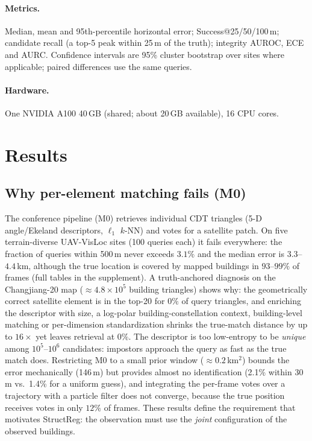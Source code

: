 \paragraph{Metrics.}
Median, mean and 95th-percentile horizontal error; Success@25/50/100\,m;
candidate recall (a top-5 peak within 25\,m of the truth); integrity AUROC,
ECE and AURC. Confidence intervals are 95\% cluster bootstrap over sites where
applicable; paired differences use the same queries.

\paragraph{Hardware.}
One NVIDIA A100 40\,GB (shared; about 20\,GB available), 16 CPU cores.

\section{Results}
\label{sec:exp_main}

\subsection{Why per-element matching fails (M0)}
\label{sec:why_m0}
The conference pipeline (M0) retrieves individual CDT triangles (5-D
angle/Ekeland descriptors, $\ell_1$ $k$-NN) and votes for a satellite patch.
On five terrain-diverse UAV-VisLoc sites (100 queries each) it fails
everywhere: the fraction of queries within 500\,m never exceeds $3.1\%$ and the
median error is $3.3$--$4.4$\,km, although the true location is covered by
mapped buildings in $93$--$99\%$ of frames (full tables in the supplement).
A truth-anchored diagnosis on the Changjiang-20 map
($\approx4.8\times10^5$ building triangles) shows why: the geometrically
correct satellite element is in the top-20 for $0\%$ of query triangles, and
enriching the descriptor with size, a log-polar building-constellation
context, building-level matching or per-dimension standardization shrinks the
true-match distance by up to $16\times$ yet leaves retrieval at $0\%$. The
descriptor is too low-entropy to be \emph{unique} among $10^5$--$10^6$
candidates: impostors approach the query as fast as the true match does.
Restricting M0 to a small prior window ($\approx0.2$\,km$^2$) bounds the error
mechanically (146\,m) but provides almost no identification (2.1\% within
30\,m vs.\ 1.4\% for a uniform guess), and integrating the per-frame votes over a
trajectory with a particle filter does not converge, because the true position
receives votes in only $12\%$ of frames. These results define the requirement
that motivates StructReg: the observation must use the \emph{joint}
configuration of the observed buildings.


